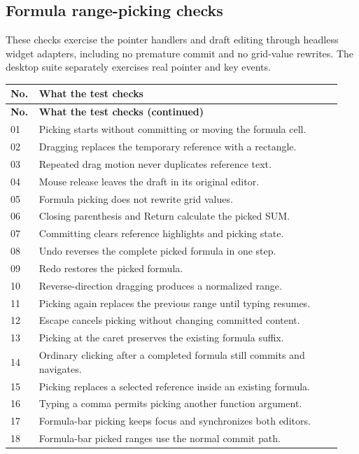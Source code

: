 \documentclass[11pt,letterpaper]{article}
\begin{document}
\subsection{Formula range-picking checks}
These checks exercise the pointer handlers and draft editing through headless
widget adapters, including no premature commit and no grid-value rewrites.
The desktop suite separately exercises real pointer and key events.
\begin{longtable}{@{}P{0.07\linewidth}P{0.87\linewidth}@{}}
\toprule\textbf{No.} & \textbf{What the test checks}\\\midrule\endfirsthead
\toprule\textbf{No.} & \textbf{What the test checks (continued)}\\\midrule\endhead
01 & Picking starts without committing or moving the formula cell.\\
02 & Dragging replaces the temporary reference with a rectangle.\\
03 & Repeated drag motion never duplicates reference text.\\
04 & Mouse release leaves the draft in its original editor.\\
05 & Formula picking does not rewrite grid values.\\
06 & Closing parenthesis and Return calculate the picked SUM.\\
07 & Committing clears reference highlights and picking state.\\
08 & Undo reverses the complete picked formula in one step.\\
09 & Redo restores the picked formula.\\
10 & Reverse-direction dragging produces a normalized range.\\
11 & Picking again replaces the previous range until typing resumes.\\
12 & Escape cancels picking without changing committed content.\\
13 & Picking at the caret preserves the existing formula suffix.\\
14 & Ordinary clicking after a completed formula still commits and navigates.\\
15 & Picking replaces a selected reference inside an existing formula.\\
16 & Typing a comma permits picking another function argument.\\
17 & Formula-bar picking keeps focus and synchronizes both editors.\\
18 & Formula-bar picked ranges use the normal commit path.\\

\end{longtable}
\end{document}
